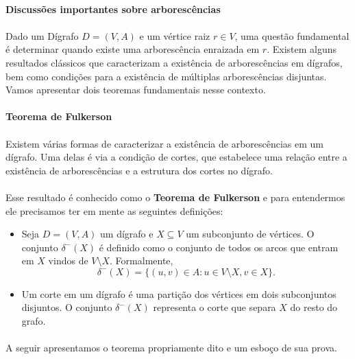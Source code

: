 \documentclass[12pt,a4paper]{article}
\begin{document}
\paragraph{Discussões importantes sobre arborescências}

\paragraph{}
Dado um Dígrafo \(D = (V, A)\) e um vértice raiz \(r \in V\), uma questão fundamental é determinar quando existe uma arborescência enraizada em \(r\).
Existem alguns resultados clássicos que caracterizam a existência de arborescências em dígrafos, bem como condições para a existência de múltiplas arborescências disjuntas. Vamos apresentar dois teoremas fundamentais nesse contexto.

\paragraph{Teorema de Fulkerson}

\paragraph{}
Existem várias formas de caracterizar a existência de arborescências em um dígrafo. Uma delas é via a condição de cortes, que estabelece uma relação entre a existência de arborescências e a estrutura dos cortes no dígrafo.

\paragraph{}
Esse resultado é conhecido como o \textbf{Teorema de Fulkerson} e para entendermos ele precisamos ter em mente as seguintes definições:

\begin{itemize}
    \item Seja \(D = (V, A)\) um dígrafo e \(X \subseteq V\) um subconjunto de vértices. O conjunto \(\delta^-(X)\) é definido como o conjunto de todos os arcos que entram em \(X\) vindos de \(V \setminus X\). Formalmente,
    \[
    \delta^-(X) = \{(u, v) \in A : u \in V \setminus X, v \in X\}.
    \]
    \item Um corte em um dígrafo é uma partição dos vértices em dois subconjuntos disjuntos. O conjunto \(\delta^-(X)\) representa o corte que separa \(X\) do resto do grafo.
\end{itemize}

\paragraph{}
A seguir apresentamos o teorema propriamente dito e um esboço de sua prova.
\end{document}
